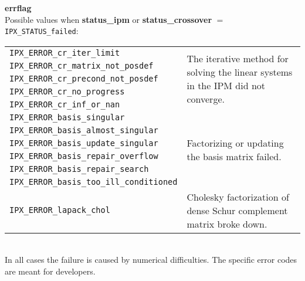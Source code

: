 \documentclass{article}
\newcommand{\ct}{\texttt}
\newcommand{\info}[2]{
  \noindent\begin{minipage}{\textwidth}
    \textbf{#1}\\
    #2
  \end{minipage}
  \vskip 1\baselineskip
}
\begin{document}
\info{errflag}{
  Possible values when \textbf{status\_ipm} or \textbf{status\_crossover} $=$
  \ct{IPX\_STATUS\_failed}:\\[1em]
  \begin{tabular}{lp{8cm}}
    \ct{IPX\_ERROR\_cr\_iter\_limit} &
    \multirow{5}{8cm}{The iterative method for solving the linear systems in the
      IPM did not converge.}\\
    \ct{IPX\_ERROR\_cr\_matrix\_not\_posdef} &\\
    \ct{IPX\_ERROR\_cr\_precond\_not\_posdef} &\\
    \ct{IPX\_ERROR\_cr\_no\_progress} &\\
    \ct{IPX\_ERROR\_cr\_inf\_or\_nan} &\\[1em]
    \ct{IPX\_ERROR\_basis\_singular} &
    \multirow{6}{8cm}{Factorizing or updating the basis matrix failed.}\\
    \ct{IPX\_ERROR\_basis\_almost\_singular} &\\
    \ct{IPX\_ERROR\_basis\_update\_singular} &\\
    \ct{IPX\_ERROR\_basis\_repair\_overflow} &\\
    \ct{IPX\_ERROR\_basis\_repair\_search} &\\
    \ct{IPX\_ERROR\_basis\_too\_ill\_conditioned} &\\[1em]
    \ct{IPX\_ERROR\_lapack\_chol} & Cholesky factorization of dense Schur
    complement matrix broke down.
  \end{tabular}\\[1em]
  In all cases the failure is caused by numerical difficulties. The specific
  error codes are meant for developers.
}
\end{document}
